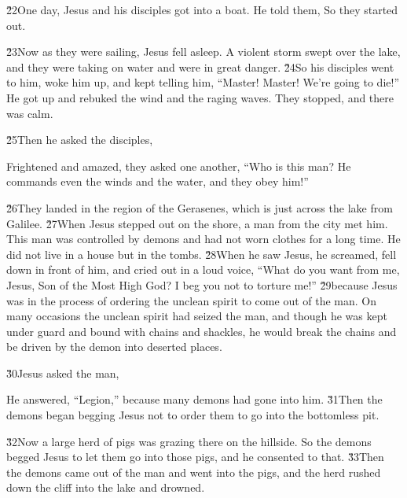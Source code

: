 \v{22}One day, Jesus and his disciples got into a boat. He told them,  So they started out.

\v{23}Now as they were sailing, Jesus fell asleep. A violent storm swept over the lake, and they were taking on water and were in great danger. \v{24}So his disciples went to him, woke him up, and kept telling him, ``Master! Master! We're going to die!'' He got up and rebuked the wind and the raging waves. They stopped, and there was calm.

\v{25}Then he asked the disciples, 

Frightened and amazed, they asked one another, ``Who is this man? He commands even the winds and the water, and they obey him!''

\v{26}They landed in the region of the Gerasenes, which is just across the lake from Galilee. \v{27}When Jesus stepped out on the shore, a man from the city met him. This man was controlled by demons and had not worn clothes for a long time. He did not live in a house but in the tombs. \v{28}When he saw Jesus, he screamed, fell down in front of him, and cried out in a loud voice, ``What do you want from me, Jesus, Son of the Most High God? I beg you not to torture me!'' \v{29}because Jesus was in the process of ordering the unclean spirit to come out of the man. On many occasions the unclean spirit had seized the man, and though he was kept under guard and bound with chains and shackles, he would break the chains and be driven by the demon into deserted places.

\v{30}Jesus asked the man, 

He answered, ``Legion,'' because many demons had gone into him. \v{31}Then the demons began begging Jesus not to order them to go into the bottomless pit.

\v{32}Now a large herd of pigs was grazing there on the hillside. So the demons begged Jesus to let them go into those pigs, and he consented to that. \v{33}Then the demons came out of the man and went into the pigs, and the herd rushed down the cliff into the lake and drowned.

